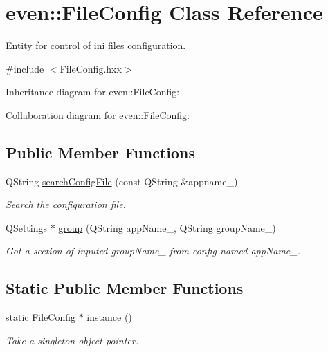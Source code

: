 \hypertarget{classeven_1_1_file_config}{}\section{even\+:\+:File\+Config Class Reference}
\label{classeven_1_1_file_config}


Entity for control of ini files configuration.  




{\ttfamily \#include $<$File\+Config.\+hxx$>$}



Inheritance diagram for even\+:\+:File\+Config\+:


Collaboration diagram for even\+:\+:File\+Config\+:
\subsection*{Public Member Functions}
\begin{DoxyCompactItemize}
\item 
\mbox{\label{classeven_1_1_file_config_adcc4d56503e78dc6d25e26a8865c85af}} 
Q\+String \mbox{\hyperlink{classeven_1_1_file_config_adcc4d56503e78dc6d25e26a8865c85af}{search\+Config\+File}} (const Q\+String \&appname\+\_\+)
\begin{DoxyCompactList}\small\item\em Search the configuration file. \end{DoxyCompactList}\item 
\mbox{\label{classeven_1_1_file_config_a4e9d37724f94f24635a235d7bb4fd8c9}} 
Q\+Settings $\ast$ \mbox{\hyperlink{classeven_1_1_file_config_a4e9d37724f94f24635a235d7bb4fd8c9}{group}} (Q\+String app\+Name\+\_\+, Q\+String group\+Name\+\_\+)
\begin{DoxyCompactList}\small\item\em Got a section of inputed group\+Name\+\_\+ from config named app\+Name\+\_\+. \end{DoxyCompactList}\end{DoxyCompactItemize}
\subsection*{Static Public Member Functions}
\begin{DoxyCompactItemize}
\item 
\mbox{\label{classeven_1_1_file_config_a6e8ac7d6bbea761eb3b6d8d7faf17744}} 
static \mbox{\hyperlink{classeven_1_1_file_config}{File\+Config}} $\ast$ \mbox{\hyperlink{classeven_1_1_file_config_a6e8ac7d6bbea761eb3b6d8d7faf17744}{instance}} ()
\begin{DoxyCompactList}\small\item\em Take a singleton object pointer. \end{DoxyCompactList}\end{DoxyCompactItemize}


